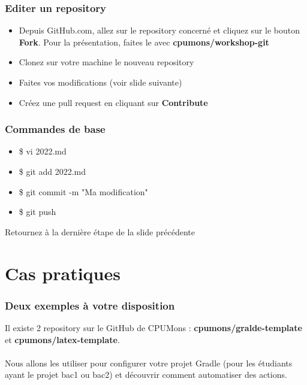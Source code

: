 \documentclass{beamer}
\begin{document}
\begin{frame}\frametitle{Editer un repository}
    \begin{itemize}
    \item Depuis GitHub.com, allez sur le repository concerné et cliquez sur le bouton \textbf{Fork}. Pour la présentation, faites le avec \textbf{cpumons/workshop-git}\\
        \item Clonez sur votre machine le nouveau repository \\
        \item Faites vos modifications (voir slide suivante) \\
        \item Créez une pull request en cliquant sur \textbf{Contribute}
    \end{itemize}
\end{frame}


\begin{frame}\frametitle{Commandes de base}
    \begin{itemize}
        \item \$ vi 2022.md
        \item \$ git add 2022.md
        \item \$ git commit -m "Ma modification"
        \item \$ git push
    \end{itemize}

    Retournez à la dernière étape de la slide précédente
\end{frame}

\section{Cas pratiques} %

\begin{frame}\frametitle{Deux exemples à votre disposition}
    Il existe 2 repository sur le GitHub de CPUMons : \textbf{cpumons/gralde-template} et \textbf{cpumons/latex-template}. \\~\\

    Nous allons les utiliser pour configurer votre projet Gradle (pour les étudiants ayant le projet bac1 ou bac2) et découvrir comment automatiser des actions.
\end{frame}
\end{document}
